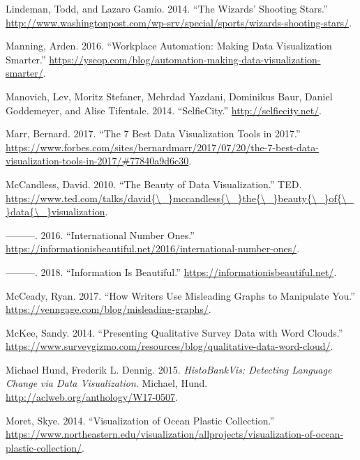 \documentclass[]{book}
\theoremstyle{definition}
\theoremstyle{definition}
\theoremstyle{definition}
\theoremstyle{remark}
\begin{document}
\hypertarget{ref-basketball}{}
Lindeman, Todd, and Lazaro Gamio. 2014. ``The Wizards' Shooting Stars.''
\url{http://www.washingtonpost.com/wp-srv/special/sports/wizards-shooting-stars/}.

\hypertarget{ref-work_place}{}
Manning, Arden. 2016. ``Workplace Automation: Making Data Visualization
Smarter.''
\url{https://yseop.com/blog/automation-making-data-visualization-smarter/}.

\hypertarget{ref-selfie}{}
Manovich, Lev, Moritz Stefaner, Mehrdad Yazdani, Dominikus Baur, Daniel
Goddemeyer, and Alise Tifentale. 2014. ``SelfieCity.''
\url{http://selfiecity.net/}.

\hypertarget{ref-7_best_tools}{}
Marr, Bernard. 2017. ``The 7 Best Data Visualization Tools in 2017.''
\url{https://www.forbes.com/sites/bernardmarr/2017/07/20/the-7-best-data-visualization-tools-in-2017/\#77840a9d6c30}.

\hypertarget{ref-viz_ted}{}
McCandless, David. 2010. ``The Beauty of Data Visualization.'' TED.
\href{https://www.ted.com/talks/david\%7B/_\%7Dmccandless\%7B/_\%7Dthe\%7B/_\%7Dbeauty\%7B/_\%7Dof\%7B/_\%7Ddata\%7B/_\%7Dvisualization}{https://www.ted.com/talks/david\{\textbackslash{}\_\}mccandless\{\textbackslash{}\_\}the\{\textbackslash{}\_\}beauty\{\textbackslash{}\_\}of\{\textbackslash{}\_\}data\{\textbackslash{}\_\}visualization}.

\hypertarget{ref-country_chart}{}
---------. 2016. ``International Number Ones.''
\url{https://informationisbeautiful.net/2016/international-number-ones/}.

\hypertarget{ref-info_beautiful}{}
---------. 2018. ``Information Is Beautiful.''
\url{https://informationisbeautiful.net/}.

\hypertarget{ref-writers_manipulate}{}
McCeady, Ryan. 2017. ``How Writers Use Misleading Graphs to Manipulate
You.'' \url{https://venngage.com/blog/misleading-graphs/}.

\hypertarget{ref-wordcloud}{}
McKee, Sandy. 2014. ``Presenting Qualitative Survey Data with Word
Clouds.''
\url{https://www.surveygizmo.com/resources/blog/qualitative-data-word-cloud/}.

\hypertarget{ref-lingui_data1}{}
Michael Hund, Frederik L. Dennig. 2015. \emph{HistoBankVis: Detecting
Language Change via Data Visualization}. Michael, Hund.
\url{http://aclweb.org/anthology/W17-0507}.

\hypertarget{ref-ocean_plastic_pollution}{}
Moret, Skye. 2014. ``Visualization of Ocean Plastic Collection.''
\url{https://www.northeastern.edu/visualization/allprojects/visualization-of-ocean-plastic-collection/}.
\end{document}
